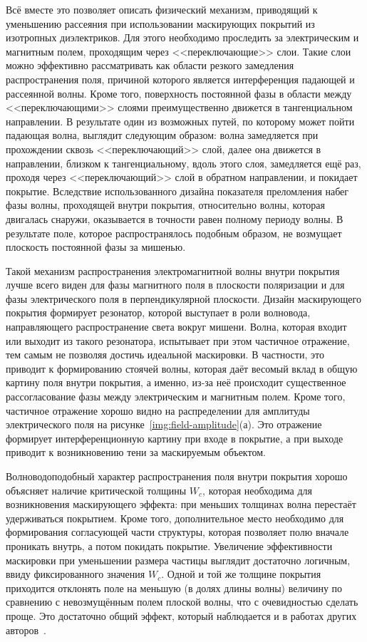 Всё вместе это позволяет описать физический механизм, приводящий к
уменьшению рассеяния при использовании маскирующих покрытий из
изотропных диэлектриков. Для этого необходимо проследить за
электрическим и магнитным полем, проходящим через <<переключающие>>
слои.  Такие слои можно эффективно рассматривать как области резкого
замедления распространения поля, причиной которого является
интерференция падающей и рассеянной волны.  Кроме того, поверхность
постоянной фазы в области между <<переключающими>> слоями
преимущественно движется  в тангенциальном направлении.
В результате один из возможных путей, по которому может пойти
падающая волна, выглядит следующим образом: волна замедляется при
прохождении сквозь <<переключающий>> слой, далее она движется в
направлении, близком к тангенциальному, вдоль этого слоя, замедляется
ещё раз, проходя через <<переключающий>> слой в обратном направлении, и
покидает покрытие.  Вследствие использованного дизайна показателя
преломления набег фазы волны, проходящей внутри покрытия, относительно
волны, которая двигалась снаружи, оказывается в точности равен полному
периоду волны.  В результате поле, которое распространялось подобным
образом, не возмущает плоскость постоянной фазы за мишенью.

Такой механизм распространения электромагнитной волны внутри покрытия
лучше всего виден для фазы магнитного поля в плоскости поляризации и
для фазы электрического поля в перпендикулярной плоскости. Дизайн
маскирующего покрытия формирует резонатор, которой выступает в роли
волновода, направляющего распространение света вокруг мишени. Волна,
которая входит или выходит из такого резонатора, испытывает при этом
частичное отражение, тем самым не позволяя достичь идеальной
маскировки. В частности, это приводит к формированию стоячей волны,
которая даёт весомый вклад в общую картину поля внутри покрытия, а
именно, из-за неё происходит существенное рассогласование фазы между
электрическим и магнитным полем. Кроме того, частичное отражение
хорошо видно на распределении для амплитуды электрического поля на
рисунке~\ref{img:field-amplitude}(а). Это
отражение формирует интерференционную картину при входе в покрытие, а
при выходе приводит к возникновению тени за маскируемым объектом.

Волноводоподобный характер распространения поля внутри покрытия хорошо
объясняет наличие критической толщины $W_c$, которая необходима для
возникновения маскирующего эффекта: при меньших толщинах волна
перестаёт удерживаться покрытием. Кроме того, дополнительное место
необходимо для формирования согласующей части структуры, которая
позволяет полю вначале проникать внутрь, а потом покидать
покрытие. Увеличение эффективности маскировки при уменьшении размера
частицы выглядит достаточно логичным, ввиду фиксированного значения
$W_c$.  Одной и той же толщине покрытия приходится отклонять поле на
меньшую (в долях длины волны) величину по сравнению с невозмущённым
полем плоской волны, что с очевидностью сделать проще. Это достаточно
общий эффект, который наблюдается и в работах других
авторов~\cite{Alu-2005,Semouchkina-2013}.

